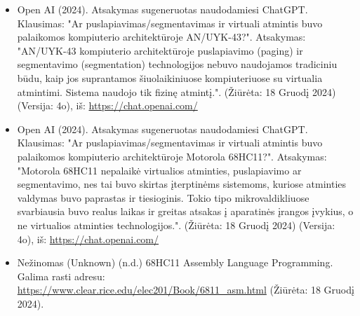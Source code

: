 \documentclass[a4paper,12pt]{article}
\begin{document}
\begin{itemize}
    \item Open AI (2024). Atsakymas sugeneruotas naudodamiesi ChatGPT. Klausimas: "Ar puslapiavimas/segmentavimas ir virtuali atmintis buvo palaikomos kompiuterio architektūroje AN/UYK-43?". Atsakymas: "AN/UYK-43 kompiuterio architektūroje puslapiavimo (paging) ir segmentavimo (segmentation) technologijos nebuvo naudojamos tradiciniu būdu, kaip jos suprantamos šiuolaikiniuose kompiuteriuose su virtualia atmintimi. Sistema naudojo tik fizinę atmintį.". (Žiūrėta: 18 Gruodį 2024) (Versija: 4o), iš: \url{https://chat.openai.com/}
    \item Open AI (2024). Atsakymas sugeneruotas naudodamiesi ChatGPT. Klausimas: "Ar puslapiavimas/segmentavimas ir virtuali atmintis buvo palaikomos kompiuterio architektūroje Motorola 68HC11?". Atsakymas: "Motorola 68HC11 nepalaikė virtualios atminties, puslapiavimo ar segmentavimo, nes tai buvo skirtas įterptinėms sistemoms, kuriose atminties valdymas buvo paprastas ir tiesioginis. Tokio tipo mikrovaldikliuose svarbiausia buvo realus laikas ir greitas atsakas į aparatinės įrangos įvykius, o ne virtualios atminties technologijos.". (Žiūrėta: 18 Gruodį 2024) (Versija: 4o), iš: \url{https://chat.openai.com/}
    \item Nežinomas (Unknown) (n.d.) 68HC11 Assembly Language Programming. Galima rasti adresu: \url{https://www.clear.rice.edu/elec201/Book/6811_asm.html} (Žiūrėta: 18 Gruodį 2024).

\end{itemize}
\end{document}
